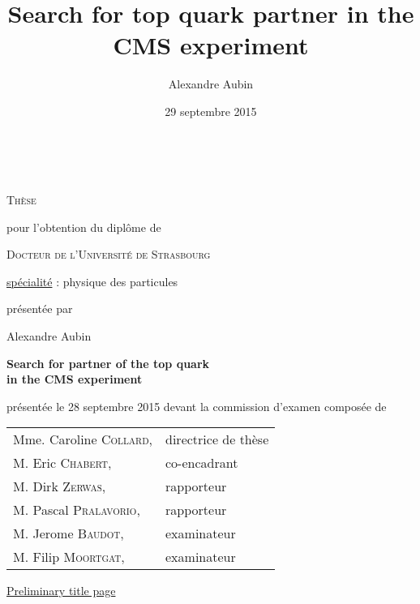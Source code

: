 


\title{Search for top quark partner in the CMS experiment}
\author{Alexandre Aubin}
\date{29 septembre 2015}



\begin{titlepage}
    \vspace*{1cm}
    \begin{center}
        \\

        \vspace*{0.8cm}

        {\Large \textsc{Thèse}}

        \vspace*{0.8cm}

        pour l'obtention du diplôme de

        \vspace*{0.8cm}

        {\Large \textsc{Docteur de l'Université de Strasbourg}}

        \vspace*{0.8cm}

        \underline{spécialité} : physique des particules

        \vspace*{0.8cm}

        présentée par

        Alexandre Aubin

        \vspace*{0.8cm}

        {\Large \textbf{Search for partner of the top quark\\ in the CMS experiment}}

        \vspace*{0.8cm}

        présentée le 28 septembre 2015 devant la commission d'examen composée de

        \vspace*{0.8cm}

        \begin{tabular}{ll}
            Mme. Caroline \textsc{Collard}, & directrice de thèse\\
            M. Eric \textsc{Chabert},       & co-encadrant\\
            M. Dirk \textsc{Zerwas},        & rapporteur\\
            M. Pascal \textsc{Pralavorio},  & rapporteur\\
            M. Jerome \textsc{Baudot},      & examinateur\\
            M. Filip \textsc{Moortgat},     & examinateur\\
        \end{tabular}

        \vspace*{0.5cm}

        \underline{\Huge{Preliminary title page}}

    \end{center}
    \vspace*{1cm}
\end{titlepage}


